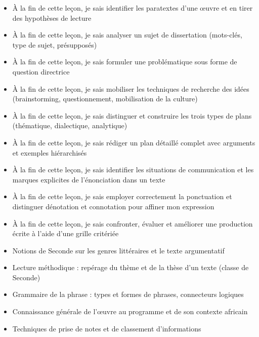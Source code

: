 \documentclass[11pt]{article}
\begin{document}
\begin{objectifs}
\begin{itemize}
\item À la fin de cette leçon, je sais identifier les paratextes d'une œuvre et en tirer des hypothèses de lecture
\item À la fin de cette leçon, je sais analyser un sujet de dissertation (mots-clés, type de sujet, présupposés)
\item À la fin de cette leçon, je sais formuler une problématique sous forme de question directrice
\item À la fin de cette leçon, je sais mobiliser les techniques de recherche des idées (brainstorming, questionnement, mobilisation de la culture)
\item À la fin de cette leçon, je sais distinguer et construire les trois types de plans (thématique, dialectique, analytique)
\item À la fin de cette leçon, je sais rédiger un plan détaillé complet avec arguments et exemples hiérarchisés
\item À la fin de cette leçon, je sais identifier les situations de communication et les marques explicites de l'énonciation dans un texte
\item À la fin de cette leçon, je sais employer correctement la ponctuation et distinguer dénotation et connotation pour affiner mon expression
\item À la fin de cette leçon, je sais confronter, évaluer et améliorer une production écrite à l'aide d'une grille critériée
\end{itemize}
\end{objectifs}

\begin{prerequis}
\begin{itemize}
\item Notions de Seconde sur les genres littéraires et le texte argumentatif
\item Lecture méthodique : repérage du thème et de la thèse d'un texte (classe de Seconde)
\item Grammaire de la phrase : types et formes de phrases, connecteurs logiques
\item Connaissance générale de l'œuvre au programme et de son contexte africain
\item Techniques de prise de notes et de classement d'informations
\end{itemize}
\end{prerequis}
\end{document}
